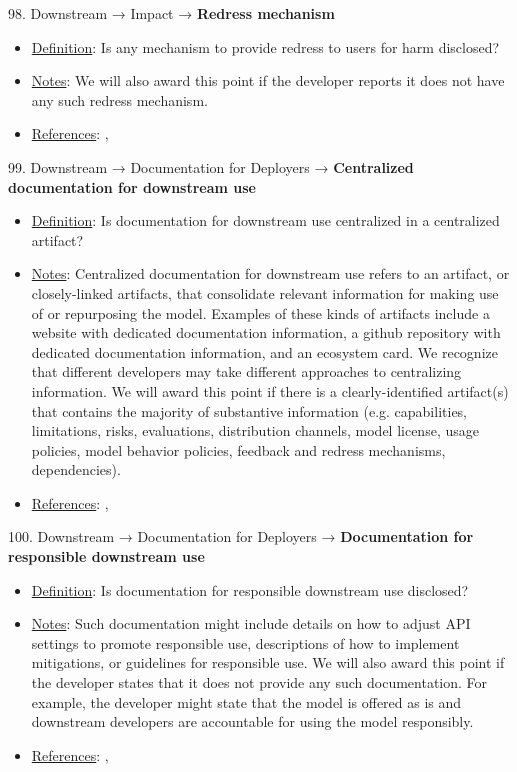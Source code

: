 98. Downstream → Impact → \textbf{Redress mechanism}
\vspace{-\parskip}
\begin{itemize}
	\item
	\underline{Definition}: Is any mechanism to provide redress to users for harm disclosed?
	\item
	\underline{Notes}: We will also award this point if the developer reports it does not have any such redress mechanism.
	\item
	\underline{References}: \citet{vipra2023}, \citet{bommasani2023ecosystem}
\end{itemize}


99. Downstream → Documentation for Deployers → \textbf{Centralized documentation for downstream use}
\vspace{-\parskip}
\begin{itemize}
	\item
	\underline{Definition}: Is documentation for downstream use centralized in a centralized artifact?
	\item
	\underline{Notes}: Centralized documentation for downstream use refers to an artifact, or closely-linked artifacts, that consolidate relevant information for making use of or repurposing the model. Examples of these kinds of artifacts include a website with dedicated documentation information, a github repository with dedicated documentation information, and an ecosystem card. We recognize that different developers may take different approaches to centralizing information. We will award this point if there is a clearly-identified artifact(s) that contains the majority of substantive information (e.g. capabilities, limitations, risks, evaluations, distribution channels, model license, usage policies, model behavior policies, feedback and redress mechanisms, dependencies).
	\item
	\underline{References}: \citet{gebru2021datasheets}, \citet{mitchell2019model}
\end{itemize}


100. Downstream → Documentation for Deployers → \textbf{Documentation for responsible downstream use}
\vspace{-\parskip}
\begin{itemize}
	\item
	\underline{Definition}: Is documentation for responsible downstream use disclosed?
	\item
	\underline{Notes}: Such documentation might include details on how to adjust API settings to promote responsible use, descriptions of how to implement mitigations, or guidelines for responsible use. We will also award this point if the developer states that it does not provide any such documentation. For example, the developer might state that the model is offered as is and downstream developers are accountable for using the model responsibly.
	\item
	\underline{References}: \citet{bommasani2023ecosystem}, \citet{brown2023allocating}
\end{itemize}


\clearpage